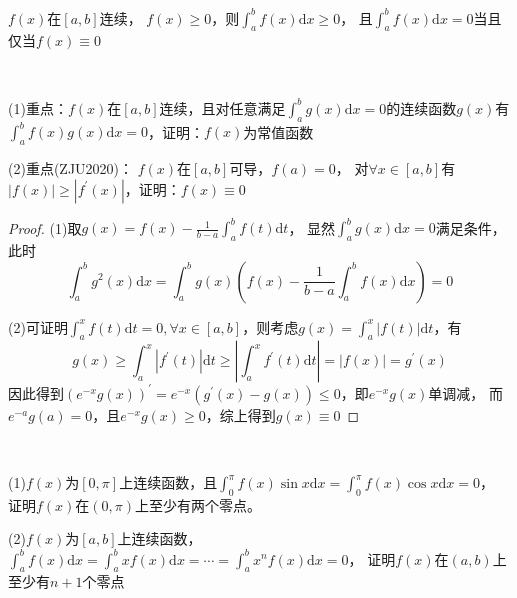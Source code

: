 \begin{theorem}[定积分保号性]
  $f(x)$在$[a,b]$连续，
  $f(x) \geq 0$，则$\int_a^b f(x)\mathrm{d} x \geq 0$，
  且$\int_a^b f(x)\mathrm{d} x = 0$当且仅当$f(x) \equiv 0$
\end{theorem}

~

\begin{exercise}[等于0的推广]
  (1)重点：$f(x)$在$[a,b]$连续，且对任意满足$\int_a^b g(x)\mathrm{d} x = 0$的连续函数$g(x)$有
  $\int_a^b f(x)g(x)\mathrm{d} x = 0$，证明：$f(x)$为常值函数

  (2)重点(ZJU2020)：
  $f(x)$在$[a,b]$可导，$f(a) = 0$，
  对$\forall x \in [a,b]$有$|f(x)| \geq |f^{\prime}(x)|$，证明：$f(x) \equiv 0$
\end{exercise}

\begin{proof}
  (1)取$g(x) = f(x) - \frac{1}{b-a}\int_a^b f(t)\mathrm{d} t$，
  显然$\int_a^b g(x)\mathrm{d} x = 0$满足条件，
  此时
  \begin{equation*}
    \int_a^b g^2(x)\mathrm{d}x = \int _a^b g(x) \left( f(x) - \frac{1}{b-a} \int_a^b f(x)\mathrm{d} x \right) = 0
  \end{equation*}

  (2)可证明$\int_a^x f(t)\mathrm{d} t = 0, \forall x \in [a,b]$，则考虑$g(x) = \int_a^x |f(t)|\mathrm{d} t$，有
  \begin{equation*}
    g(x) \geq \int_a^x|f^{\prime}(t)|\mathrm{d} t \geq \left| \int_a^x f^{\prime}(t)\mathrm{d} t \right| = |f(x) | = g^{\prime}(x)
  \end{equation*}
  因此得到$(e^{-x}g(x))^{\prime} = e^{-x}(g^{\prime}(x) - g(x)) \leq 0$，即$e^{-x}g(x)$单调减，
  而$e^{-a}g(a) = 0$，且$e^{-x}g(x) \geq 0$，综上得到$g(x) \equiv 0$
\end{proof}

~

\begin{exercise}[零点问题]
  (1)$f(x)$为$[0,\pi]$上连续函数，且$\int_0^{\pi} f(x) \sin x\mathrm{d} x = \int_0^{\pi} f(x) \cos x \mathrm{d} x = 0$，
  证明$f(x)$在$(0,\pi)$上至少有两个零点。

  (2)$f(x)$为$[a,b]$上连续函数，
  $\int_a^b f(x)\mathrm{d} x = \int_a^b xf(x)\mathrm{d} x = \cdots = \int_a^b x^n f(x)\mathrm{d}x = 0$，
  证明$f(x)$在$(a,b)$上至少有$n+1$个零点
\end{exercise}

